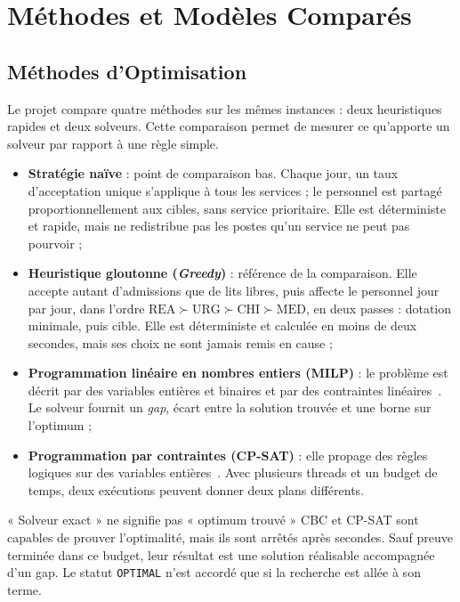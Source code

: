 \section{Méthodes et Modèles Comparés}

\subsection{Méthodes d'Optimisation}
Le projet compare quatre méthodes sur les mêmes instances : deux heuristiques rapides et deux solveurs. Cette comparaison permet de mesurer ce qu'apporte un solveur par rapport à une règle simple.
\begin{itemize}
    \item \textbf{Stratégie naïve} : point de comparaison bas. Chaque jour, un taux d'acceptation unique s'applique à tous les services ; le personnel est partagé proportionnellement aux cibles, sans service prioritaire. Elle est déterministe et rapide, mais ne redistribue pas les postes qu'un service ne peut pas pourvoir ;
    \item \textbf{Heuristique gloutonne (\emph{Greedy})} : référence de la comparaison. Elle accepte autant d'admissions que de lits libres, puis affecte le personnel jour par jour, dans l'ordre $\text{REA} \succ \text{URG} \succ \text{CHI} \succ \text{MED}$, en deux passes : dotation minimale, puis cible. Elle est déterministe et calculée en moins de deux secondes, mais ses choix ne sont jamais remis en cause ;
    \item \textbf{Programmation linéaire en nombres entiers (MILP)} : le problème est décrit par des variables entières et binaires et par des contraintes linéaires~\cite{wolsey2020}. Le solveur fournit un \emph{gap}, écart entre la solution trouvée et une borne sur l'optimum ;
    \item \textbf{Programmation par contraintes (CP-SAT)} : elle propage des règles logiques sur des variables entières~\cite{rossi2006}. Avec plusieurs threads et un budget de temps, deux exécutions peuvent donner deux plans différents.
\end{itemize}

\begin{notebox}{« Solveur exact » ne signifie pas « optimum trouvé »}
CBC et CP-SAT sont capables de prouver l'optimalité, mais ils sont arrêtés après \TempsSolveur{} secondes. Sauf preuve terminée dans ce budget, leur résultat est une solution réalisable accompagnée d'un gap. Le statut \texttt{OPTIMAL} n'est accordé que si la recherche est allée à son terme.
\end{notebox}

